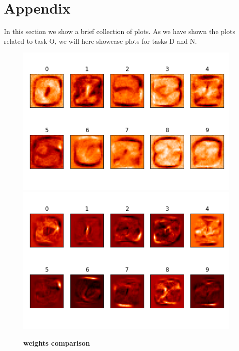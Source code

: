 \documentclass[letterpaper, 12 pt, conference]{ieeeconf}
\begin{document}
\newpage 

\section{Appendix}

In this section we show a brief collection of plots. 
As we have shown the plots related to task O, 
we will here showcase plots for tasks D and N. 



\begin{figure}[h]
\caption{\textbf{weights comparison}}
\centering
\includegraphics[scale=0.4]{"../images/linear_network"}
\includegraphics[scale=0.4]{"../images/fast_network"}
\end{figure}
\end{document}
